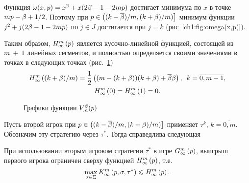 {Функция $\omega(x, p) = x^2 + x(2\beta - 1 - 2mp)$ достигает минимума по $x$ в точке $m p - \beta + 1/2$.
Поэтому при $p \in \left( (k-{\overline{\beta}})/m, (k+\beta)/m) \right]$ минимум функции $j^2 + j(2\beta - 1 - 2 m p)$ по $j \in J$ достигается при $j = k$ (\seename рис~\ref{ch1:fig:omega(x,p)}).

Таким образом, $H_{\infty}^m\left({p}\right)$ является кусочно-линейной функцией, состоящей из $m~+~1$ линейных сегментов, и полностью определяется своими значениями в точках в следующих точках (\seename рис.~\ref{ch1:fig:Hm})
\begin{gather*}
  H_{\infty}^m\left({(k+\beta)/m}\right) = \frac{1}{2} \left( (m - (k + \beta))(k + \beta) + {\overline{\beta}}\beta
  \right),\enskip
  k = \overline{0, m - 1},\\
  H_{\infty}^m\left({0}\right) = H_{\infty}^m\left({1}\right) = 0.
\end{gather*}

\begin{figure}[thb]
  \centering
  \caption{Графики функции $V^{\beta}_m(p)$}
  \label{ch1:fig:Hm}
\end{figure}

Пусть второй игрок при $p \in \left( (k-{\overline{\beta}})/m, (k+\beta)/m) \right]$ применяет $\tau^k, \, k = \overline{0, m}$.
Обозначим эту стратегию через $\tau^*$.
Тогда справедлива следующая
\begin{lemma}
  \label{ch1:lemma:upperBound}
  При использовании вторым игроком стратегии $\tau^*$ в игре $G_{\infty}^m\left({p}\right)$\textup{,} выигрыш первого игрока ограничен сверху функцией $H_{\infty}^m\left({p}\right)$, т.е.
  \[
    \max_{\sigma \in \Sigma} K_{\infty}^m\left({p}, {\sigma}, {\tau^*}\right) \leqslant
    H_{\infty}^m\left({p}\right).
  \]
\end{lemma}

}
